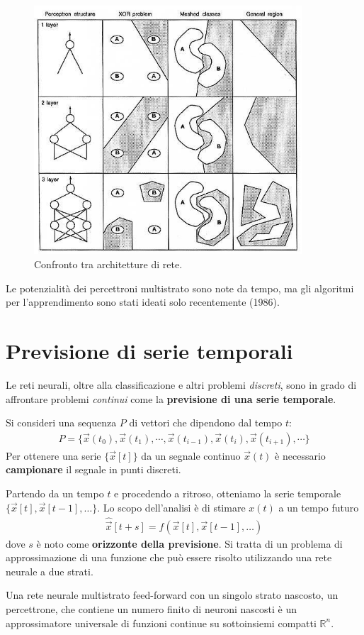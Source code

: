 \begin{figure}[h!]
	\centering
	\includegraphics[width=10cm]{images/layers}
	\caption{Confronto tra architetture di rete.}
	\label{fig:architetture}
\end{figure}

\noindent Le potenzialità dei percettroni multistrato sono note da tempo, ma gli algoritmi per l'apprendimento sono stati ideati solo recentemente (1986).

\section{Previsione di serie temporali}
\label{sec:previsione_di_serie_temporali}

Le reti neurali, oltre alla classificazione e altri problemi \emph{discreti}, sono in grado di affrontare problemi \emph{continui} come la \textbf{previsione di una serie temporale}.

Si consideri una sequenza $P$ di vettori che dipendono dal tempo $t$:
\begin{align*}
	P = \{\vec{x}(t_0), \vec{x}(t_1), \cdots, \vec{x}(t_{i - 1}), \vec{x}(t_i), \vec{x}(t_{i + 1}), \cdots\}
\end{align*}
Per ottenere una serie $\{\vec{x}[t]\}$ da un segnale continuo $\vec{x}(t)$ è necessario \textbf{campionare} il segnale in punti discreti. 

Partendo da un tempo $t$ e procedendo a ritroso, otteniamo la serie temporale $\{\vec{x}[t], \vec{x}[t-1], \dots\}$. Lo scopo dell'analisi è di stimare $x(t)$ a un tempo futuro
\begin{align*}
	\hat{\vec{x}}[t+s] = f(\vec{x}[t], \vec{x}[t-1], \dots)
\end{align*}
dove $s$ è noto come \textbf{orizzonte della previsione}. Si tratta di un problema di approssimazione di una funzione che può essere risolto utilizzando una rete neurale a due strati.

\begin{thm}
	Una rete neurale multistrato feed-forward con un singolo strato nascosto, un percettrone, che contiene un numero finito di neuroni nascosti è un approssimatore universale di funzioni continue su sottoinsiemi compatti $\mathbb{R}^n$.
\end{thm}
